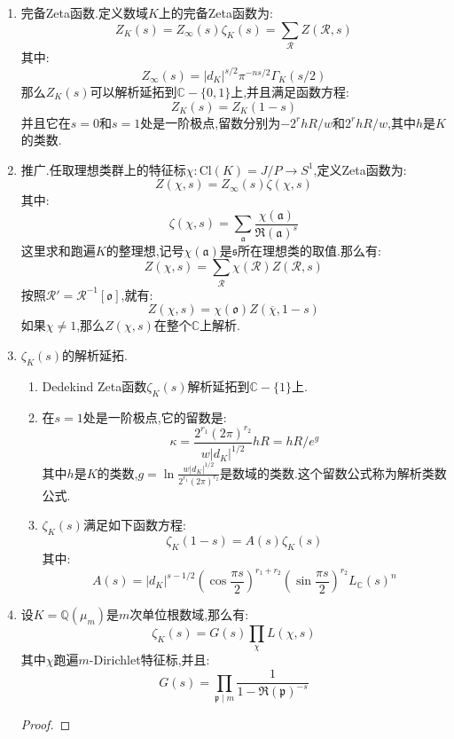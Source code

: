 \begin{enumerate}
\begin{proof}
    	设$f(t)=f_F(\mathfrak{a},t)$和$g(t)=f_{F^{-1}}((\mathfrak{a}\mathfrak{o})^{-1},t)$,那么有:
    	$$f(1/t)=t^{1/2}g(t)$$
    	$$f(t)=a_0+O(e^{-ct^{1/n}}),g(t)=a_0+O(e^{-ct^{1/n}}),a_0=\frac{2^{r-1}R}{w}$$
    	按照Mellin原理,$L(f,s)$和$L(g,s)$可以解析延拓到$\mathbb{C}-\{0,\frac{1}{2}\}$上,并且满足:
    	$$L(f,s)=L(g,\frac{1}{2}-s)$$
    	其中$L(f,s)$在$s=0$和$1/2$处是一阶极点,留数分别为$-a_0$和$a_0$.进而有:
    	$$Z(\mathscr{R},s)=L(f,\frac{s}{2})$$
    	解析延拓到$\mathbb{C}-\{0,1\}$上,它在$s=0$和1处是一阶极点,留数分别为$-2a_0$和$2a_0$.并且满足:
    	$$Z(\mathscr{R},s)=L(f,\frac{s}{2})=L(g,\frac{1-s}{2})=Z(\mathscr{R}',1-s)$$
    \end{proof}
    \item 完备Zeta函数.定义数域$K$上的完备Zeta函数为:
    $$Z_K(s)=Z_{\infty}(s)\zeta_K(s)=\sum_{\mathscr{R}}Z(\mathscr{R},s)$$
    其中:$$Z_{\infty}(s)=|d_K|^{s/2}\pi^{-ns/2}\Gamma_K(s/2)$$
    那么$Z_K(s)$可以解析延拓到$\mathbb{C}-\{0,1\}$上,并且满足函数方程:
    $$Z_K(s)=Z_K(1-s)$$
    并且它在$s=0$和$s=1$处是一阶极点,留数分别为$-2^rhR/w$和$2^rhR/w$,其中$h$是$K$的类数.
    \item 推广.任取理想类群上的特征标$\chi:\mathrm{Cl}(K)=J/P\to S^1$,定义Zeta函数为:
    $$Z(\chi,s)=Z_{\infty}(s)\zeta(\chi,s)$$
    其中:$$\zeta(\chi,s)=\sum_{\mathfrak{a}}\frac{\chi(\mathfrak{a})}{\mathfrak{R}(\mathfrak{a})^s}$$
    这里求和跑遍$K$的整理想,记号$\chi(\mathfrak{a})$是$\mathfrak{s}$所在理想类的取值.那么有:
    $$Z(\chi,s)=\sum_{\mathscr{R}}\chi(\mathscr{R})Z(\mathscr{R},s)$$
    按照$\mathscr{R}'=\mathscr{R}^{-1}[\mathfrak{o}]$,就有:
    $$Z(\chi,s)=\chi(\mathfrak{o})Z(\overline{\chi},1-s)$$
    如果$\chi\not=1$,那么$Z(\chi,s)$在整个$\mathbb{C}$上解析.
    \item $\zeta_K(s)$的解析延拓.
    \begin{enumerate}[(1)]
    	\item Dedekind Zeta函数$\zeta_K(s)$解析延拓到$\mathbb{C}-\{1\}$上.
    	\item 在$s=1$处是一阶极点,它的留数是:
    	$$\kappa=\frac{2^{r_1}(2\pi)^{r_2}}{w|d_K|^{1/2}}hR=hR/e^g$$
    	其中$h$是$K$的类数,$g=\ln\frac{w|d_K|^{1/2}}{2^{r_1}(2\pi)^{r_2}}$是数域的类数.这个留数公式称为解析类数公式.
    	\item $\zeta_K(s)$满足如下函数方程:
    	$$\zeta_K(1-s)=A(s)\zeta_K(s)$$
    	其中:
    	$$A(s)=|d_K|^{s-1/2}\left(\cos\frac{\pi s}{2}\right)^{r_1+r_2}\left(\sin\frac{\pi s}{2}\right)^{r_2}L_{\mathbb{C}}(s)^n$$
    \end{enumerate}
    \item 设$K=\mathbb{Q}(\mu_m)$是$m$次单位根数域,那么有:
    $$\zeta_K(s)=G(s)\prod_{\chi}L(\chi,s)$$
    其中$\chi$跑遍$m$-Dirichlet特征标,并且:
    $$G(s)=\prod_{\mathfrak{p}\mid m}\frac{1}{1-\mathfrak{R}(\mathfrak{p})^{-s}}$$
    \begin{proof}
    	

\end{proof}
\end{enumerate}
